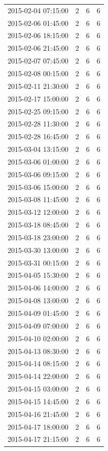 \begin{tabular}{lrrr}
2015-02-04 07:15:00 & 2 & 6 & 6 \\
2015-02-06 01:45:00 & 2 & 6 & 6 \\
2015-02-06 18:15:00 & 2 & 6 & 6 \\
2015-02-06 21:45:00 & 2 & 6 & 6 \\
2015-02-07 07:45:00 & 2 & 6 & 6 \\
2015-02-08 00:15:00 & 2 & 6 & 6 \\
2015-02-11 21:30:00 & 2 & 6 & 6 \\
2015-02-17 15:00:00 & 2 & 6 & 6 \\
2015-02-25 09:15:00 & 2 & 6 & 6 \\
2015-02-28 11:30:00 & 2 & 6 & 6 \\
2015-02-28 16:45:00 & 2 & 6 & 6 \\
2015-03-04 13:15:00 & 2 & 6 & 6 \\
2015-03-06 01:00:00 & 2 & 6 & 6 \\
2015-03-06 09:15:00 & 2 & 6 & 6 \\
2015-03-06 15:00:00 & 2 & 6 & 6 \\
2015-03-08 11:45:00 & 2 & 6 & 6 \\
2015-03-12 12:00:00 & 2 & 6 & 6 \\
2015-03-18 08:45:00 & 2 & 6 & 6 \\
2015-03-18 23:00:00 & 2 & 6 & 6 \\
2015-03-30 13:00:00 & 2 & 6 & 6 \\
2015-03-31 00:15:00 & 2 & 6 & 6 \\
2015-04-05 15:30:00 & 2 & 6 & 6 \\
2015-04-06 14:00:00 & 2 & 6 & 6 \\
2015-04-08 13:00:00 & 2 & 6 & 6 \\
2015-04-09 01:45:00 & 2 & 6 & 6 \\
2015-04-09 07:00:00 & 2 & 6 & 6 \\
2015-04-10 02:00:00 & 2 & 6 & 6 \\
2015-04-13 08:30:00 & 2 & 6 & 6 \\
2015-04-14 08:15:00 & 2 & 6 & 6 \\
2015-04-14 22:00:00 & 2 & 6 & 6 \\
2015-04-15 03:00:00 & 2 & 6 & 6 \\
2015-04-15 14:45:00 & 2 & 6 & 6 \\
2015-04-16 21:45:00 & 2 & 6 & 6 \\
2015-04-17 18:00:00 & 2 & 6 & 6 \\
2015-04-17 21:15:00 & 2 & 6 & 6 \\

\end{tabular}
